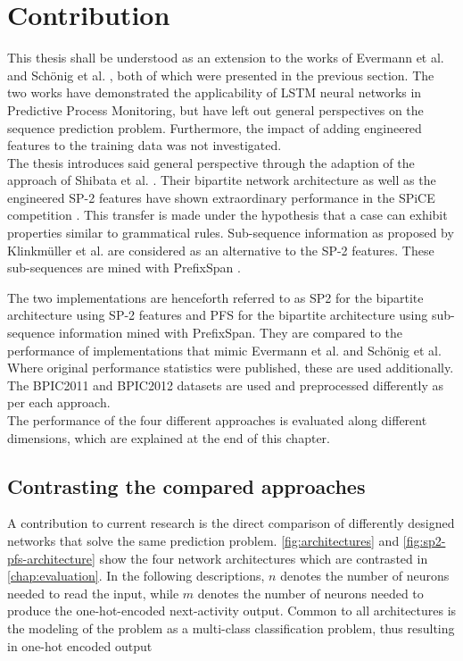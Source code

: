 \chapter{Contribution}\label{chap:contribution}
This thesis shall be understood as an extension to the works of Evermann et al. \cite{evermann2016} and Schönig et al. \cite{schoenig2018}, both of which were presented in the previous section. The two works have demonstrated the applicability of LSTM neural networks in Predictive Process Monitoring, but have left out general perspectives on the sequence prediction problem. Furthermore, the impact of adding engineered features to the training data was not investigated.\\

The thesis introduces said general perspective through the adaption of the approach of Shibata et al. \cite{shibata2016bipartite}. Their bipartite network architecture as well as the engineered SP-2 features have shown extraordinary performance in the SPiCE competition \cite{web:spice}. This transfer is made under the hypothesis that a case can exhibit properties similar to grammatical rules. Sub-sequence information as proposed by Klinkmüller et al. \cite{klinkmuller2018reliablemonitoring} are considered as an alternative to the SP-2 features. These sub-sequences are mined with PrefixSpan \cite{pei2001prefixspan}.

The two implementations are henceforth referred to as SP2 for the bipartite architecture using SP-2 features and PFS for the bipartite architecture using sub-sequence information mined with PrefixSpan. They are compared to the performance of implementations that mimic Evermann et al. and Schönig et al. Where original performance statistics were published, these are used additionally. The BPIC2011 \cite{BPIC2011} and BPIC2012 \cite{BPIC2012} datasets are used and preprocessed differently as per each approach.\\

The performance of the four different approaches is evaluated along different dimensions, which are explained at the end of this chapter.

\section{Contrasting the compared approaches}
A contribution to current research is the direct comparison of differently designed networks that solve the same prediction problem. \autoref{fig:architectures} and \autoref{fig:sp2-pfs-architecture} show the four network architectures which are contrasted in \autoref{chap:evaluation}. In the following descriptions, $n$ denotes the number of neurons needed to read the input, while $m$ denotes the number of neurons needed to produce the one-hot-encoded next-activity output. Common to all architectures is the modeling of the problem as a multi-class classification problem, thus resulting in one-hot encoded output\\

